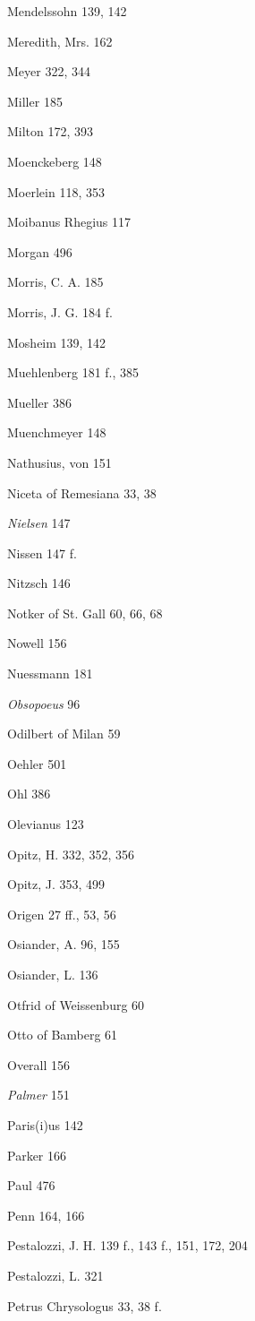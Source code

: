 Mendelssohn 139, 142

Meredith, Mrs. 162

Meyer 322, 344

Miller 185

Milton 172, 393

Moenckeberg 148

Moerlein 118, 353

Moibanus Rhegius 117

Morgan 496

Morris, C. A. 185

Morris, J. G. 184 f.

Mosheim 139, 142

Muehlenberg 181 f., 385

Mueller 386

Muenchmeyer 148

Nathusius, von 151

Niceta of Remesiana 33, 38

\emph{Nielsen} 147

Nissen 147 f.

Nitzsch 146

Notker of St. Gall 60, 66, 68

Nowell 156

Nuessmann 181

\emph{Obsopoeus} 96

Odilbert of Milan 59

Oehler 501

Ohl 386

Olevianus 123

Opitz, H. 332, 352, 356

Opitz, J. 353, 499

Origen 27 ff., 53, 56

Osiander, A. 96, 155

Osiander, L. 136

Otfrid of Weissenburg 60

Otto of Bamberg 61

Overall 156

\emph{Palmer} 151

Paris(i)us 142

Parker 166

Paul 476

Penn 164, 166

Pestalozzi, J. H. 139 f., 143 f., 151, 172, 204

Pestalozzi, L. 321

Petrus Chrysologus 33, 38 f.

